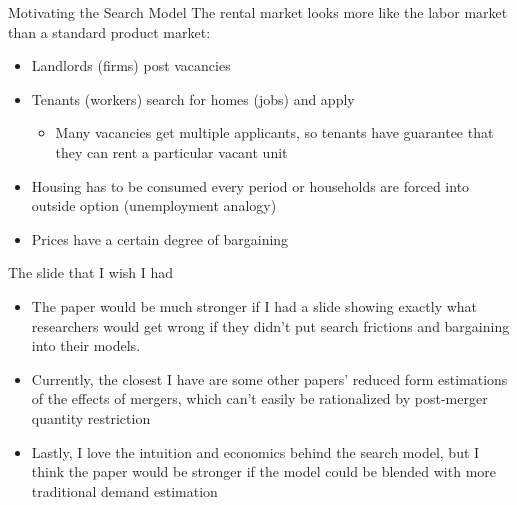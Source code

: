 \documentclass[10pt, xcolor=dvipsnames]{beamer}
\begin{document}
\begin{frame}{Motivating the Search Model}
The rental market looks more like the labor market than a standard product market:\\
    \begin{itemize}
        \item Landlords (firms) post vacancies
        \item Tenants (workers) search for homes (jobs) and apply
        \begin{itemize}
            \item Many vacancies get multiple applicants, so tenants have guarantee that they can rent a particular vacant unit
        \end{itemize}
        \item Housing has to be consumed every period or households are forced into outside option (unemployment analogy)
        \item Prices have a certain degree of bargaining
    \end{itemize}

    \hyperlink{slide:fern-prices}{}
    
\end{frame}

\begin{frame}{The slide that I wish I had}

\begin{itemize}
    \item The paper would be much stronger if I had a slide showing exactly what researchers would get wrong if they didn't put search frictions and bargaining into their models.
    \item Currently, the closest I have are some other papers' reduced form estimations of the effects of mergers, which can't easily be rationalized by post-merger quantity restriction
    \item Lastly, I love the intuition and economics behind the search model, but I think the paper would be stronger if the model could be blended with more traditional demand estimation
\end{itemize}
    
\end{frame}


    
\end{document}
